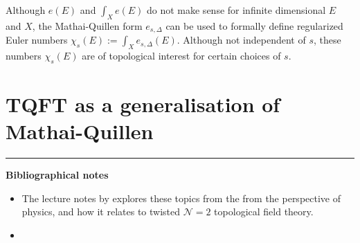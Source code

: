 Although $e(E)$ and  $\int_X e(E)$ do not make sense for
infinite dimensional  $E$ and  $X$, the Mathai-Quillen form  $e_{s,\Delta}$ can
be used to formally define regularized Euler numbers $\chi_s(E) := \int_X
e_{s,\Delta}(E)$. Although not independent of $s$, these numbers  $\chi_s(E)$
are of topological interest for certain choices of  $s$.  


\section{TQFT as a generalisation of Mathai-Quillen}


\vspace{5mm}
\hrule 
\vspace{5mm}

\textbf{Bibliographical notes}
{\small
\begin{itemize}
	\item The lecture notes by \citet{cordes95} explores these topics from the
	from the perspective of physics, and how it relates to twisted
	$\mathcal{N}=2$ topological field theory.
	\item 
\end{itemize}
}


